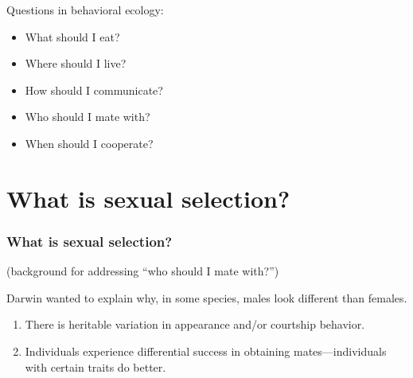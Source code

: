 \begin{frame}[t]
    \begin{adjustwidth}{-2em}{-1.5em}
        Questions in behavioral ecology:

        \begin{itemize}
            \item What should I eat?

                \vspace{4mm}
            \item Where should I live?

                \vspace{4mm}
            \item How should I communicate?

                \vspace{4mm}
            \item Who should I mate with?

                \vspace{4mm}
            \item When should I cooperate?
        \end{itemize}
    \end{adjustwidth}
\end{frame}

\section[What is sexual selection?]{What is sexual selection?}

\begin{noheadline}
\begin{frame}[t]
    \frametitle{What is sexual selection?}
    \begin{adjustwidth}{-2em}{-1.5em}
        (background for addressing ``who should I mate with?'')

        \vspace{3mm}
        Darwin wanted to explain why, in some species, males look different than
        females.
        \begin{enumerate}
            \item There is heritable variation in appearance and/or courtship
                behavior.

                \vspace{5mm}
            \item Individuals experience differential success in obtaining
                mates---individuals with certain traits do better.
        \end{enumerate}
    \end{adjustwidth}
\end{frame}
\end{noheadline}

